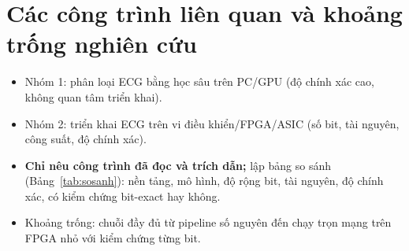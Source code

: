\section{Các công trình liên quan và khoảng trống nghiên cứu}\label{sec:lienquan}
\begin{goiy}
  \begin{itemize}
    \item Nhóm 1: phân loại ECG bằng học sâu trên PC/GPU (độ chính xác cao, không quan tâm triển khai).
    \item Nhóm 2: triển khai ECG trên vi điều khiển/FPGA/ASIC (số bit, tài nguyên, công suất, độ chính xác).
    \item \textbf{Chỉ nêu công trình đã đọc và trích dẫn;} lập bảng so sánh (Bảng~\ref{tab:sosanh}): nền tảng, mô hình, độ rộng bit, tài nguyên, độ chính xác, có kiểm chứng bit-exact hay không.
    \item Khoảng trống: chuỗi đầy đủ từ pipeline số nguyên đến chạy trọn mạng trên FPGA nhỏ với kiểm chứng từng bit.
  \end{itemize}
\end{goiy}
